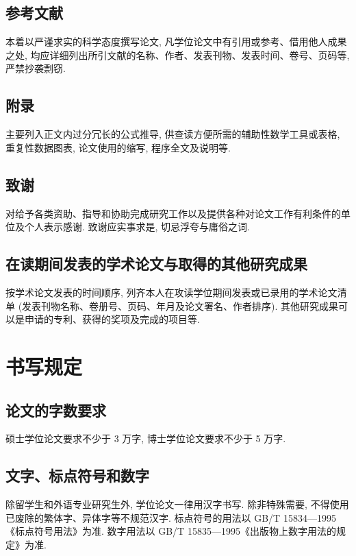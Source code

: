 \subsection{参考文献}

本着以严谨求实的科学态度撰写论文, 凡学位论文中有引用或参考、借用他人成果之处, 均应详细列出所引文献的名称、作者、发表刊物、发表时间、卷号、页码等, 严禁抄袭剽窃. 　　

\subsection{附录}

主要列入正文内过分冗长的公式推导, 供查读方便所需的辅助性数学工具或表格, 重复性数据图表, 论文使用的缩写, 程序全文及说明等.

\subsection{致谢}

对给予各类资助、指导和协助完成研究工作以及提供各种对论文工作有利条件的单位及个人表示感谢. 致谢应实事求是, 切忌浮夸与庸俗之词.

\subsection{在读期间发表的学术论文与取得的其他研究成果}

按学术论文发表的时间顺序, 列齐本人在攻读学位期间发表或已录用的学术论文清单 (发表刊物名称、卷册号、页码、年月及论文署名、作者排序). 其他研究成果可以是申请的专利、获得的奖项及完成的项目等.

\section{书写规定}

\subsection{论文的字数要求}

硕士学位论文要求不少于 3 万字, 博士学位论文要求不少于 5 万字.

\subsection{文字、标点符号和数字}

除留学生和外语专业研究生外, 学位论文一律用汉字书写. 除非特殊需要, 不得使用已废除的繁体字、异体字等不规范汉字. 标点符号的用法以 GB/T 15834—1995《标点符号用法》为准. 数字用法以 GB/T 15835—1995《出版物上数字用法的规定》为准.

